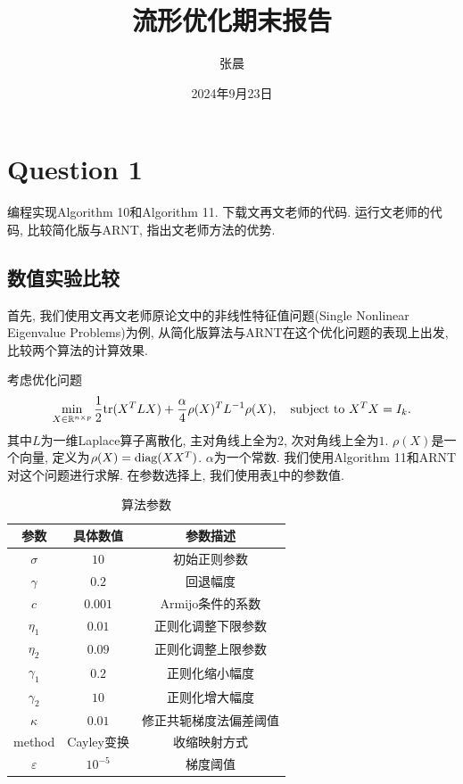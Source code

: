 \documentclass[UTF8]{ctexart}
\begin{document}
\title{流形优化期末报告}
\author{张晨}
\date{2024年9月23日}
\maketitle

\section{Question 1}

编程实现Algorithm 10和Algorithm 11. 下载文再文老师的代码. 运行文老师的代码, 比较简化版与ARNT, 指出文老师方法的优势. 

\subsection{数值实验比较}

首先, 我们使用文再文老师原论文中的非线性特征值问题(Single Nonlinear Eigenvalue Problems)为例, 从简化版算法与ARNT在这个优化问题的表现上出发, 比较两个算法的计算效果. 

考虑优化问题
\[\min_{X\in\mathbb{R}^{n\times p}} \frac{1}{2} \textup{tr}(X^T LX)+\frac{\alpha}{4}\rho(X)^T L^{-1}\rho(X),\quad\textup{subject to }X^T X=I_k.\]
其中$L$为一维Laplace算子离散化, 主对角线上全为$2$, 次对角线上全为$1$. $\rho(X)$是一个向量, 定义为$\rho(X)=\textup{diag}(XX^T)$. $\alpha$为一个常数. 我们使用Algorithm 11和ARNT对这个问题进行求解. 在参数选择上, 我们使用表\ref{tab2}中的参数值. 

\begin{table}[htb]
    \centering
    \begin{tabular}{c|cc}
        \hline
        \hline
        参数 & 具体数值 & 参数描述\\
        \hline
        $\sigma$ & $10$ & 初始正则参数\\
        $\gamma$ & $0.2$ & 回退幅度\\
        $c$ & $0.001$ & Armijo条件的系数\\
        $\eta_1$ & $0.01$ & 正则化调整下限参数\\
        $\eta_2$ & $0.09$ & 正则化调整上限参数\\
        $\gamma_1$ & $0.2$ & 正则化缩小幅度\\
        $\gamma_2$ & $10$ & 正则化增大幅度\\
        $\kappa$ & $0.01$ & 修正共轭梯度法偏差阈值\\
        method & Cayley变换 & 收缩映射方式\\
        $\varepsilon$ & $10^{-5}$ & 梯度阈值\\
        \hline
        \hline
    \end{tabular}
    \caption{算法参数}\label{tab2}
\end{table}
\end{document}
